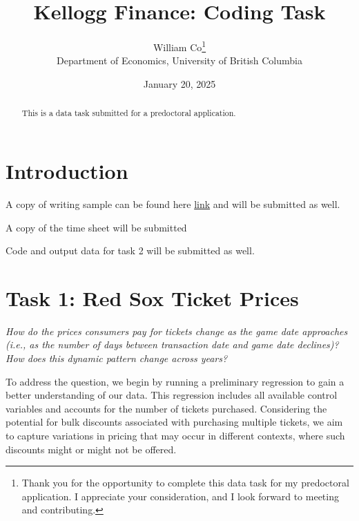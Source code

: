 \documentclass[
  12pt]{article}
\begin{document}
\def\spacingset#1{\renewcommand{\baselinestretch}%
{#1}\small\normalsize} \spacingset{1}



\date{January 20, 2025}
\title{\bf Kellogg Finance: Coding Task}
\author{
William Co\thanks{Thank you for the opportunity to complete this data
task for my predoctoral application. I appreciate your consideration,
and I look forward to meeting and contributing.}\\
Department of Economics, University of British Columbia\\
}
\maketitle

\bigskip
\bigskip
\begin{abstract}
This is a data task submitted for a predoctoral application.
\end{abstract}


\newpage
\spacingset{1.9} %

\section{Introduction}\label{introduction}

A copy of writing sample can be found here
\href{https://github.com/WilliamClintC/EvaluativeAssignment_2024/blob/main/EvaluativeAssignment_2024/Writing\%20Sample.pdf}{link}
and will be submitted as well.
\citep{coEvaluativeAssignment_2024EvaluativeAssignment_2024Writing}

A copy of the time sheet will be submitted

Code and output data for task 2 will be submitted as well.

\section{Task 1: Red Sox Ticket
Prices}\label{task-1-red-sox-ticket-prices}

\emph{How do the prices consumers pay for tickets change as the game
date approaches (i.e., as the number of days between transaction date
and game date declines)? How does this dynamic pattern change across
years?}

To address the question, we begin by running a preliminary regression to
gain a better understanding of our data. This regression includes all
available control variables and accounts for the number of tickets
purchased. Considering the potential for bulk discounts associated with
purchasing multiple tickets, we aim to capture variations in pricing
that may occur in different contexts, where such discounts might or
might not be offered.
\end{document}
